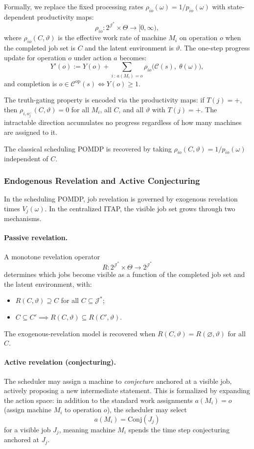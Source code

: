 Formally, we replace the fixed processing rates $\rho_{io}(\omega) = 1/p_{io}(\omega)$
with state-dependent productivity maps:
\[
\rho_{io} : 2^{\mathcal{J}^*} \times \Theta \to [0, \infty),
\]
where $\rho_{io}(C, \vartheta)$ is the effective work rate of machine $M_i$ on
operation $o$ when the completed job set is $C$ and the latent environment is
$\vartheta$. The one-step progress update for operation $o$ under action $a$ becomes:
\[
Y'(o) := Y(o) + \sum_{i\,:\, a(M_i) = o}
\rho_{io}\bigl(\mathcal{C}(s),\; \theta(\omega)\bigr),
\]
and completion is $o \in \mathcal{C}^{\mathrm{op}}(s) \iff Y(o) \ge 1$.


The truth-gating property is encoded via the productivity maps: if $T(j) = +$, then
$\rho_{i,o_j^-}(C, \vartheta) = 0$ for all $M_i$, all $C$, and all $\vartheta$ with
$T(j) = +$. The intractable direction accumulates no progress regardless of how many
machines are assigned to it.

The classical scheduling POMDP is recovered by taking $\rho_{io}(C, \vartheta) =
1/p_{io}(\omega)$ independent of $C$.

\subsubsection{Endogenous Revelation and Active Conjecturing}

In the scheduling POMDP, job revelation is governed by exogenous revelation times
$V_j(\omega)$. In the centralized ITAP, the visible job set grows through two
mechanisms.

\paragraph{Passive revelation.} A monotone revelation operator
\[
R : 2^{\mathcal{J}^*} \times \Theta \to 2^{\mathcal{J}^*}
\]
determines which jobs become visible as a function of the completed job set and the
latent environment, with:
\begin{itemize}
    \item $R(C, \vartheta) \supseteq C$ for all $C \subseteq \mathcal{J}^*$;
    \item $C \subseteq C' \implies R(C, \vartheta) \subseteq R(C', \vartheta)$.
\end{itemize}
The exogenous-revelation model is recovered when $R(C, \vartheta) =
R(\varnothing, \vartheta)$ for all $C$.

\paragraph{Active revelation (conjecturing).} The scheduler may assign a machine to
\emph{conjecture} anchored at a visible job, actively proposing a new intermediate
statement. This is formalized by expanding the action space: in addition to the
standard work assignments $a(M_i) = o$ (assign machine $M_i$ to operation $o$), the
scheduler may select
\[
a(M_i) = \mathrm{Conj}(J_j)
\]
for a visible job $J_j$, meaning machine $M_i$ spends the time step conjecturing
anchored at $J_j$.

